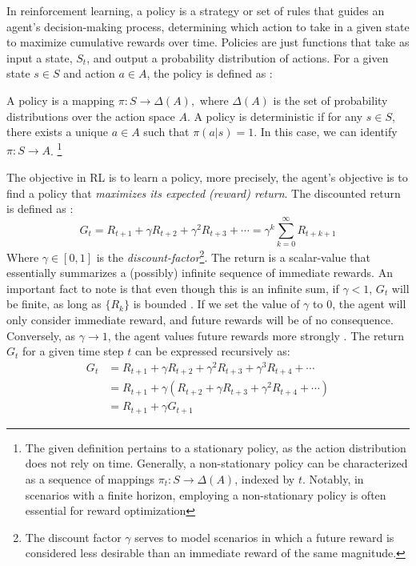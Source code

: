 In reinforcement learning, a policy is a strategy or set of rules that guides an agent's decision-making process, determining which action to take in a given state to maximize cumulative rewards over time. Policies are just functions that take as input a state, $S_t$, and output a probability distribution of actions.
For a given state $s \in S$ and action $a \in A$, the policy is defined as \cite{mohri2018}:
\begin{definition}[Policy]
    A policy is a mapping $\pi: S \to \Delta(A),$ where $\Delta(A)$ is the set of probability distributions over the action space $A$. A policy is deterministic if for any $s \in S$, there exists a unique $a \in A$ such that $\pi(a|s) = 1$. In this case, we can identify $\pi: S \to A$.
    \footnote{The given definition pertains to a stationary policy, as the action distribution does not rely on time. Generally, a non-stationary policy can be characterized as a sequence of mappings $\pi_t : S \rightarrow \Delta(A)$, indexed by $t$. Notably, in scenarios with a finite horizon, employing a non-stationary policy is often essential for reward optimization}
\end{definition}
The objective in RL is to learn a policy, more precisely, the agent's objective is to find a policy that \textit{maximizes its expected (reward) return}. The discounted return is defined as \cite{RL}:
\begin{equation}
    G_t = R_{t+1} + \gamma R_{t+2 } + \gamma^2 R_{t+3 } + \cdots = \gamma^k \sum_{k=0}^{\infty} R_{t+k+1}
\end{equation}
Where $\gamma \in [0,1]$ is the \textit{discount-factor}\footnote{ The discount factor $\gamma$ serves to model scenarios in which a future reward is considered less desirable than an immediate reward of the same magnitude.}.
The return is a scalar-value that essentially summarizes a (possibly) infinite sequence of immediate rewards. 
An important fact to note is that even though this is an infinite sum, if $\gamma < 1$, $G_t$ will be finite, as long as $\{R_k\}$ is bounded \cite{RL}. If we set the value of $\gamma$ to $0$, the agent will only consider immediate reward, and future rewards will be of no consequence. Conversely, as  $\gamma \to 1$, the agent values future rewards more strongly \cite{RL}. The return $G_t$ for a given time step $t$ can be expressed recursively as:
\begin{align}
    G_t &= R_{t+1} + \gamma R_{t+2} + \gamma^2 R_{t+3} + \gamma^3 R_{t+4} + \cdots  \nonumber \\
    &= R_{t+1} + \gamma (R_{t+2} + \gamma R_{t+3} + \gamma^2 R_{t+4} + \cdots) \nonumber \\
    &= R_{t+1} + \gamma G_{t+1} \label{return}
\end{align}
